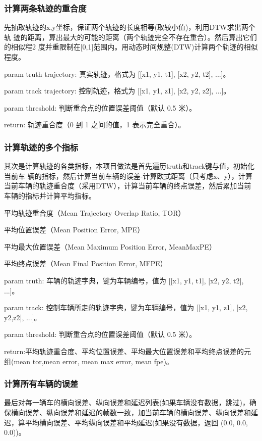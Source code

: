 \subsubsection{计算两条轨迹的重合度}
先抽取轨迹的x,y坐标，保证两个轨迹的长度相等(取较小值)，利用DTW求出两个轨  迹的距离，算出最大的可能的距离（两个轨迹完全不存在重合）。然后算出它们的相似程2 度并重限制在[0,1]范围内。用动态时间规整(DTW)计算两个轨迹的相似程度。

param truth trajectory: 真实轨迹，格式为 [[x1, y1, t1], [x2, y2, t2], ...]。

param track trajectory: 控制轨迹，格式为 [[x1, y1, z1], [x2, y2, z2], ...]。

param threshold: 判断重合点的位置误差阈值（默认 0.5 米）。

return: 轨迹重合度（0 到 1 之间的值，1 表示完全重合）。

\subsubsection{计算轨迹的多个指标}
其次是计算轨迹的各类指标，本项目做法是首先遍历truth和track键与值，初始化当前车 辆的指标，然后计算当前车辆的误差-计算欧式距离（只考虑x、y），计算当前车辆的轨迹重合度（采用DTW），计算当前车辆的终点误差，然后累加当前车辆的指标并计算平均指标。

平均轨迹重合度（Mean Trajectory Overlap Ratio, TOR）

平均位置误差（Mean Position Error, MPE）

平均最大位置误差（Mean Maximum Position Error, MeanMaxPE）

平均终点误差（Mean Final Position Error, MFPE）

param truth: 车辆的轨迹字典，键为车辆编号，值为 [[x1, y1, t1], [x2, y2, t2], ...]。

param track: 控制车辆所走的轨迹字典，键为车辆编号，值为 [[x1, y1, z1], [x2, y2,z2], ...]。

param threshold: 判断重合点的位置误差阈值（默认 0.5 米）。

return:平均轨迹重合度、平均位置误差、平均最大位置误差和平均终点误差的元组(mean tor,mean error, mean max error, mean fpe)。


\subsubsection{计算所有车辆的误差}
最后对每一辆车的横向误差、纵向误差和延迟列表(如果车辆没有数据，跳过)，确保横向误差、纵向误差和延迟的帧数一致，加当前车辆的横向误差、纵向误差和延迟，算平均横向误差、平均纵向误差和平均延迟(如果没有数据，返回 (0.0, 0.0, 0.0))。


